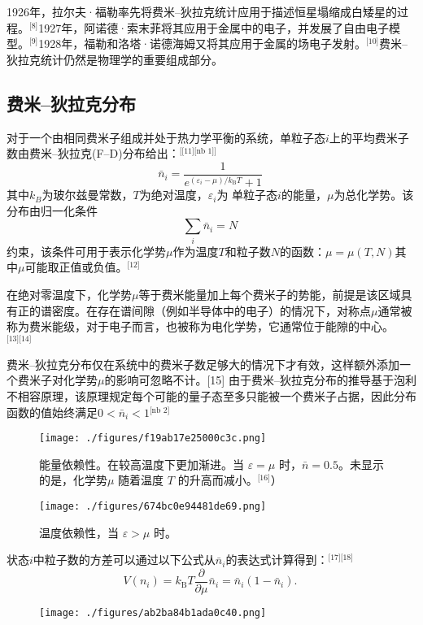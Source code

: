 1926年，拉尔夫·福勒率先将费米–狄拉克统计应用于描述恒星塌缩成白矮星的过程。\(^\text{[8]}\)1927年，阿诺德·索末菲将其应用于金属中的电子，并发展了自由电子模型。\(^\text{[9]}\)1928年，福勒和洛塔·诺德海姆又将其应用于金属的场电子发射。\(^\text{[10]}\)费米–狄拉克统计仍然是物理学的重要组成部分。
\subsection{费米–狄拉克分布}  
对于一个由相同费米子组成并处于热力学平衡的系统，单粒子态\( i \)上的平均费米子数由费米–狄拉克(F–D)分布给出：\(^\text{[[11][nb 1]]}\)   
\[
\bar{n}_{i} = \frac{1}{e^{(\varepsilon_{i} - \mu)/k_{\text{B}}T} + 1}~
\]
其中\(k_B\)为玻尔兹曼常数，\(T\)为绝对温度，\(\varepsilon_i\)为 单粒子态\(i\)的能量，\(\mu\)为总化学势。该分布由归一化条件
\[\sum_{i} \bar{n}_{i} = N~\]
约束，该条件可用于表示化学势\(\mu\)作为温度\(T\)和粒子数\(N\)的函数：\(\mu = \mu (T, N)\)其中\(\mu\)可能取正值或负值。\(^\text{[12]}\)

在绝对零温度下，化学势\(\mu\)等于费米能量加上每个费米子的势能，前提是该区域具有正的谱密度。在存在谱间隙（例如半导体中的电子）的情况下，对称点\(\mu\)通常被称为费米能级，对于电子而言，也被称为电化学势，它通常位于能隙的中心。\(^\text{[13][14]}\)

费米–狄拉克分布仅在系统中的费米子数足够大的情况下才有效，这样额外添加一个费米子对化学势\(\mu\)的影响可忽略不计。[15] 由于费米–狄拉克分布的推导基于泡利不相容原理，该原理规定每个可能的量子态至多只能被一个费米子占据，因此分布函数的值始终满足\(0 < \bar{n}_i < 1\)\(^\text{[nb 2]}\)

\begin{figure}[ht]
\centering
\texttt{[image: ./figures/f19ab17e25000c3c.png]}
\caption{能量依赖性。在较高温度下更加渐进。当 \( \varepsilon = \mu \) 时，\( \bar{n} = 0.5 \)。未显示的是，化学势\( \mu \) 随着温度 \( T \) 的升高而减小。\(^\text{[16]}\)）} \label{fig_FermiD_2}
\end{figure}
\begin{figure}[ht]
\centering
\texttt{[image: ./figures/674bc0e94481de69.png]}
\caption{温度依赖性，当 \( \varepsilon > \mu \) 时。} \label{fig_FermiD_3}
\end{figure}
状态\(i\)中粒子数的方差可以通过以下公式从\(\bar{n}_i\)的表达式计算得到：\(^\text{[17][18]}\)
\[V(n_{i}) = k_{\text{B}}T \frac{\partial}{\partial \mu} \bar{n}_{i} = \bar{n}_{i} (1 - \bar{n}_{i}).~\]
\begin{figure}[ht]
\centering
\texttt{[image: ./figures/ab2ba84b1ada0c40.png]}
\caption{} \label{fig_FermiD_4}
\end{figure}
